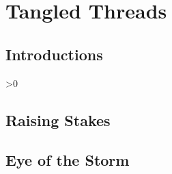 \documentclass[a4paper,openany]{book}
\begin{document}
%

\glsunsetall


\printglossary[
  style=topicmcols,
]

\pagebreak
\printglossary[
  type=symbols,
  ]

\printglossary[
  type=mech,
  style=topicmcols,
  ]

\mainmatter




\glsresetall
{}
\clearpage


\chapter{Tangled Threads}

\section{Introductions}
\begin{multicols}{2}
\ifnum\value{temperature}>0
  
  
  
  
\else
  
  
  
  
\fi
\end{multicols}

\section{Raising Stakes}
\begin{multicols}{2}



\end{multicols}

\section{Eye of the Storm}

\begin{multicols}{2}


\end{multicols}


\begin{multicols}{2}


\end{multicols}
\end{document}
